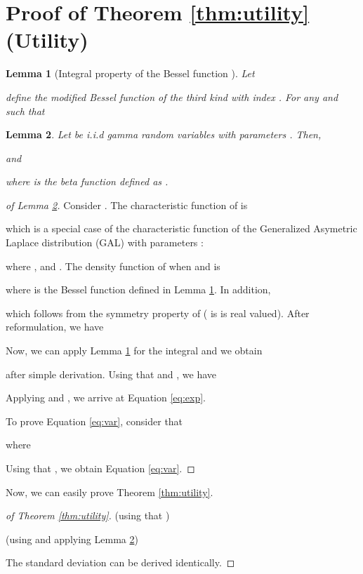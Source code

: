 \documentclass[11pt,a4paper]{article}
\theoremstyle{plain}
\theoremstyle{plain}
\theoremstyle{plain}
\theoremstyle{plain}
\newtheorem{lemma}{Lemma}
\theoremstyle{nonumberplain} \theoremseparator{}
\newtheorem{proof}{Proof}
\begin{document}



\newpage
\appendix
\section{Proof of Theorem \ref{thm:utility} (Utility)}
\label{app:proof}

\begin{lemma}[Integral property of the Bessel function \cite{kotz01book}]
\label{lem:bessel}
Let 

define the modified Bessel function of the third kind with index .
For any  and  such that 

\end{lemma}

\begin{lemma}
\label{lem:abs}
Let  be i.i.d gamma random variables with parameters . Then,

and

where  is the beta function defined as .
\end{lemma}

\begin{proof}[of Lemma \ref{lem:abs}]
Consider . The characteristic function of  is

which is a special case of the characteristic function of the Generalized Asymetric Laplace distribution (GAL) with parameters :

where , and .
The density function of  when  and  is

where  is the Bessel function defined in Lemma \ref{lem:bessel}.
In addition,

which follows from the symmetry property of  ( is is real valued). After reformulation, we have

Now, we can apply Lemma \ref{lem:bessel} for the integral and we obtain 

after simple derivation.
Using that  and , we have

Applying  and , we arrive at
Equation \eqref{eq:exp}.

To prove Equation \eqref{eq:var}, consider that

where 

Using that ,   
we obtain Equation \eqref{eq:var}.

\end{proof}
Now, we can easily prove Theorem \ref{thm:utility}.

\begin{proof}[of Theorem \ref{thm:utility}]


(using that )

(using  and applying Lemma \ref{lem:abs})

The standard deviation 
 can be derived identically.

\end{proof}
\end{document}
